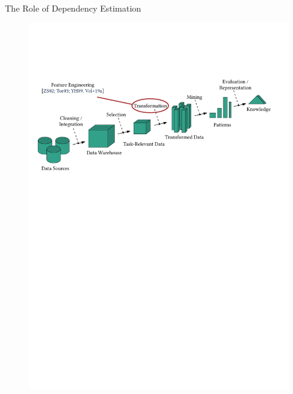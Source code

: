 \documentclass[16pt,usenames,dvipsnames, notheorems]{beamer}
\theoremstyle{definition}
\theoremstyle{example}
\theoremstyle{plain}
\begin{document}
\begin{frame}{The Role of Dependency Estimation}
\begin{figure}
\begin{overprint}
		 \includegraphics[width=0.98\linewidth]{figures/kdd_r3-compressed.pdf}

\end{overprint}
\end{figure}
\end{frame}
\end{document}
